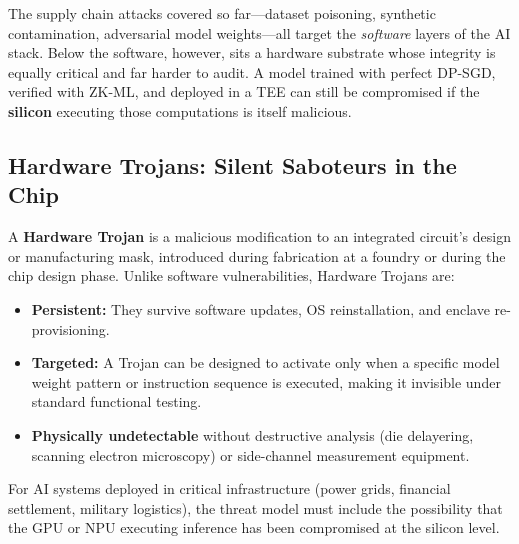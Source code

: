 The supply chain attacks covered so far---dataset poisoning, synthetic contamination, adversarial model weights---all target the \emph{software} layers of the AI stack. Below the software, however, sits a hardware substrate whose integrity is equally critical and far harder to audit. A model trained with perfect DP-SGD, verified with ZK-ML, and deployed in a TEE can still be compromised if the \textbf{silicon} executing those computations is itself malicious.

\subsection{Hardware Trojans: Silent Saboteurs in the Chip}
\label{subsec:hardware_trojans}

A \textbf{Hardware Trojan} is a malicious modification to an integrated circuit's design or manufacturing mask, introduced during fabrication at a foundry or during the chip design phase. Unlike software vulnerabilities, Hardware Trojans are:
\begin{itemize}
  \item \textbf{Persistent:} They survive software updates, OS reinstallation, and enclave re-provisioning.
  \item \textbf{Targeted:} A Trojan can be designed to activate only when a specific model weight pattern or instruction sequence is executed, making it invisible under standard functional testing.
  \item \textbf{Physically undetectable} without destructive analysis (die delayering, scanning electron microscopy) or side-channel measurement equipment.
\end{itemize}

For AI systems deployed in critical infrastructure (power grids, financial settlement, military logistics), the threat model must include the possibility that the GPU or NPU executing inference has been compromised at the silicon level.

